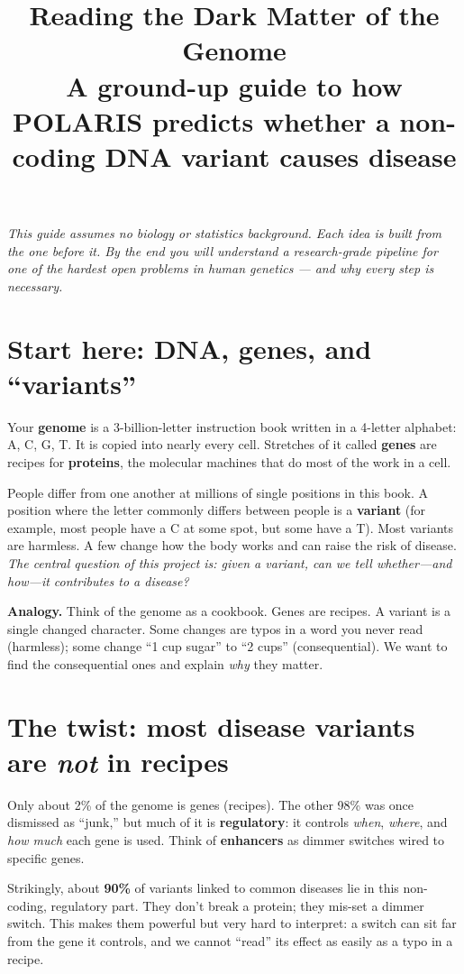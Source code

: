 \documentclass[11pt]{article}
\title{\vspace{-2em}\textbf{\color{navy}\Large Reading the Dark Matter of the Genome}\\[2mm]
\large A ground-up guide to how POLARIS predicts whether a non-coding DNA variant causes disease}
\author{}\date{\vspace{-3em}}
\newcommand{\term}[1]{\textbf{\color{navy}#1}}
\begin{document}
\maketitle

\noindent\textit{This guide assumes no biology or statistics background. Each idea is built from the
one before it. By the end you will understand a research-grade pipeline for one of the hardest open
problems in human genetics --- and why every step is necessary.}

\section{Start here: DNA, genes, and ``variants''}
Your \term{genome} is a 3-billion-letter instruction book written in a 4-letter alphabet: A, C, G, T.
It is copied into nearly every cell. Stretches of it called \term{genes} are recipes for \term{proteins},
the molecular machines that do most of the work in a cell.

People differ from one another at millions of single positions in this book. A position where the letter
commonly differs between people is a \term{variant} (for example, most people have a C at some spot, but
some have a T). Most variants are harmless. A few change how the body works and can raise the risk of
disease. \emph{The central question of this project is: given a variant, can we tell whether---and how---it
contributes to a disease?}

\begin{ana}
\textbf{Analogy.} Think of the genome as a cookbook. Genes are recipes. A variant is a single changed
character. Some changes are typos in a word you never read (harmless); some change ``1 cup sugar'' to
``2 cups'' (consequential). We want to find the consequential ones and explain \emph{why} they matter.
\end{ana}

\section{The twist: most disease variants are \emph{not} in recipes}
Only about 2\% of the genome is genes (recipes). The other 98\% was once dismissed as ``junk,'' but much
of it is \term{regulatory}: it controls \emph{when}, \emph{where}, and \emph{how much} each gene is used.
Think of \term{enhancers} as dimmer switches wired to specific genes.

Strikingly, about \textbf{90\%} of variants linked to common diseases lie in this non-coding,
regulatory part. They don't break a protein; they mis-set a dimmer switch. This makes them powerful but
very hard to interpret: a switch can sit far from the gene it controls, and we cannot ``read'' its effect
as easily as a typo in a recipe.
\end{document}
